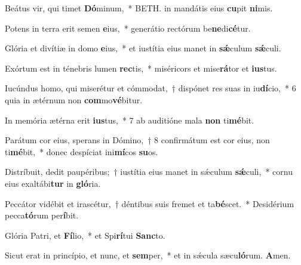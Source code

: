 \item Beátus vir, qui timet \textbf{Dó}minum,~* BETH. in mandátis eius \textbf{cu}pit \textbf{ni}mis.

\item Potens in terra erit semen \textbf{e}ius,~* generátio rectórum be\textbf{ne}di\textbf{cé}tur.

\item Glória et divítiæ in domo \textbf{e}ius,~* et iustítia eius manet in \textbf{sǽ}culum \textbf{sǽ}culi.

\item Exórtum est in ténebris lumen \textbf{rec}tis,~* miséricors et mise\textbf{rá}tor et \textbf{ius}tus.

\item Iucúndus homo, qui miserétur et cómmodat,~† dispónet res suas in iu\textbf{dí}cio,~* 6 quia in ætérnum non \textbf{com}mo\textbf{vé}bitur.

\item In memória ætérna erit \textbf{ius}tus,~* 7 ab auditióne mala \textbf{non} ti\textbf{mé}bit.

\item Parátum cor eius, sperans in Dómino,~† 8 confirmátum est cor eius, non ti\textbf{mé}bit,~* donec despíciat ini\textbf{mí}cos \textbf{su}os.

\item Distríbuit, dedit paupéribus;~† iustítia eius manet in sǽculum \textbf{sǽ}culi,~* cornu eius exaltábi\textbf{tur} in \textbf{gló}ria.

\item Peccátor vidébit et irascétur,~† déntibus suis fremet et ta\textbf{bé}scet.~* Desidérium pecca\textbf{tó}rum per\textbf{í}bit.

\item Glória Patri, et \textbf{Fí}lio,~* et Spi\textbf{rí}tui \textbf{Sanc}to.

\item Sicut erat in princípio, et nunc, et \textbf{sem}per,~* et in sǽcula sæcu\textbf{ló}rum. \textbf{A}men.